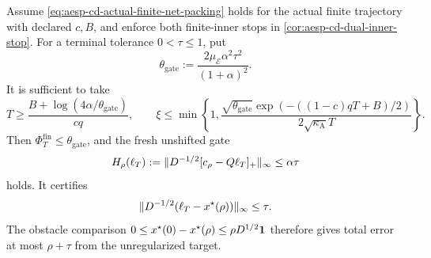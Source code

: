 \begin{corollary}
\label{cor:aesp-cd-frozen-conditional-contract}
Assume \cref{eq:aesp-cd-actual-finite-net-packing} holds for the actual finite
trajectory with declared $c,B$, and enforce both finite-inner stops in
\cref{cor:aesp-cd-dual-inner-stop}.  For a terminal tolerance
$0<\tau\leq1$, put
\begin{equation}
 \theta_{\mathrm{gate}}
 :=\frac{2\mu_{\mathcal E}\alpha^2\tau^2}{(1+\alpha)^2}.
 \label{eq:aesp-cd-frozen-gate-threshold}
\end{equation}
It is sufficient to take
\begin{equation}
 T\geq\frac{B+\log(4\alpha/\theta_{\mathrm{gate}})}{cq},
 \qquad
 \xi\leq\min\left\{1,
 \frac{\sqrt{\theta_{\mathrm{gate}}}
       \exp(-((1-c)qT+B)/2)}
      {2\sqrt{\kappa_{\mathrm A}}T}\right\}.
 \label{eq:aesp-cd-frozen-finite-parameters}
\end{equation}
Then $\Phi_T^{\mathrm{fin}}\leq\theta_{\mathrm{gate}}$, and the fresh
unshifted gate
\begin{equation}
 H_\rho(\ell_T)
 :=\lVert D^{-1/2}[c_\rho-Q\ell_T]_+\rVert_\infty
 \leq\alpha\tau
 \label{eq:aesp-cd-frozen-terminal-gate}
\end{equation}
holds.  It certifies
\begin{equation}
 \lVert D^{-1/2}(\ell_T-x^\star(\rho))\rVert_\infty\leq\tau.
 \label{eq:aesp-cd-frozen-terminal-error}
\end{equation}
The obstacle comparison
$0\leq x^\star(0)-x^\star(\rho)\leq\rho D^{1/2}\mathbf{1}$ therefore gives total
error at most $\rho+\tau$ from the unregularized target.


\end{corollary}

